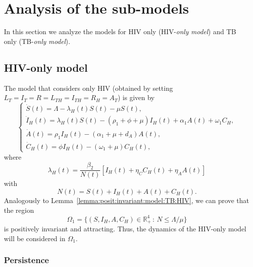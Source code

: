 \documentclass{my_aims}
\theoremstyle{definition}
\begin{document}
\section{Analysis of the sub-models}
\label{sec:submodels}

In this section we analyze the models for HIV only (HIV-\emph{only model})
and TB only (TB-\emph{only model}).

\subsection{HIV-only model}

The model that considers only HIV (obtained by setting
$L_T = I_T = R = L_{TH}= I_{TH}= R_H= A_T$) is given by
\begin{equation}
\label{model:HIV:only}
\begin{cases}
\dot{S}(t) = \Lambda - \lambda_H(t) S(t) - \mu S(t),\\[0.2 cm]
\dot{I}_H(t) = \lambda_H(t) S(t) - (\rho_1 + \phi + \mu)I_H(t)
 + \alpha_1 A(t)  + \omega_1 C_H, \\[0.2 cm]
\dot{A}(t) =  \rho_1 I_H(t) - (\alpha_1 + \mu + d_A) A(t),\\[0.2 cm]
\dot{C}_H(t) = \phi I_H(t) - (\omega_1 + \mu)C_H(t),
\end{cases}
\end{equation}
where
\begin{equation*}
\lambda_H(t) = \frac{\beta_2}{N(t)} \left[ I_H(t) + \eta_C C_H(t) + \eta_A A(t) \right]
\end{equation*}
with
\begin{equation*}
N(t) = S(t) + I_H(t) + A(t) + C_H(t).
\end{equation*}
Analogously to Lemma~\ref{lemma:posit:invariant:model:TB:HIV}, we can prove that the region
\begin{equation}
\label{Omega1:inv:region:HIV}
\Omega_1 = \{ \left( S, I_H, A, C_H \right) \in {\mathbb{R}}_+^{4} \, : \, N \leq \Lambda/\mu \}
\end{equation}
is positively invariant and attracting. Thus, the dynamics
of the HIV-only model will be considered in $\Omega_1$.

\subsubsection{Persistence}
\end{document}
